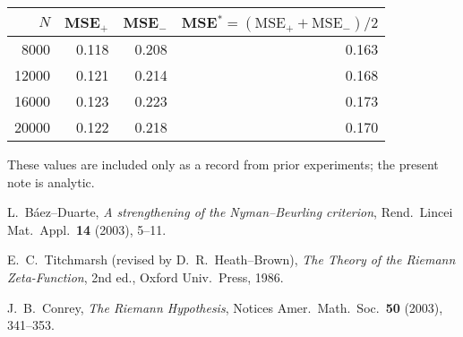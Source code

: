 \documentclass[11pt]{article}
\theoremstyle{remark}
\begin{document}
\begin{center}
\begin{tabular}{@{}rrrr@{}}
\toprule
$N$ & MSE$_+$ & MSE$_-$ & MSE$^\ast=(\text{MSE}_++\text{MSE}_-)/2$\\
\midrule
8000  & 0.118 & 0.208 & 0.163\\
12000 & 0.121 & 0.214 & 0.168\\
16000 & 0.123 & 0.223 & 0.173\\
20000 & 0.122 & 0.218 & 0.170\\
\bottomrule
\end{tabular}
\end{center}

\noindent These values are included only as a record from prior experiments; the present note is analytic.

\begin{thebibliography}{9}
L.~B\'aez--Duarte, \emph{A strengthening of the Nyman--Beurling criterion}, Rend.\ Lincei Mat.\ Appl.\ \textbf{14} (2003), 5--11.

E.~C.~Titchmarsh (revised by D.~R.~Heath--Brown), \emph{The Theory of the Riemann Zeta-Function}, 2nd ed., Oxford Univ.\ Press, 1986.

J.~B.~Conrey, \emph{The Riemann Hypothesis}, Notices Amer.\ Math.\ Soc.\ \textbf{50} (2003), 341--353.
\end{thebibliography}
\end{document}
